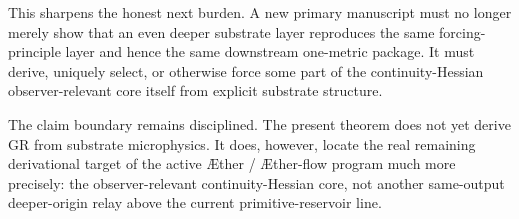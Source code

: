 \documentclass[11pt]{article}
\newcommand{\Aether}{\AE{}ther}
\newcommand{\Aflow}{\AE{}ther-flow}
\begin{document}
This sharpens the honest next burden. A new primary manuscript must no longer merely show that an even deeper substrate layer reproduces the same forcing-principle layer and hence the same downstream one-metric package. It must derive, uniquely select, or otherwise force some part of the continuity-Hessian observer-relevant core itself from explicit substrate structure.

The claim boundary remains disciplined. The present theorem does not yet derive GR from substrate microphysics. It does, however, locate the real remaining derivational target of the active \Aether{} / \Aflow{} program much more precisely: the observer-relevant continuity-Hessian core, not another same-output deeper-origin relay above the current primitive-reservoir line.
\end{document}
